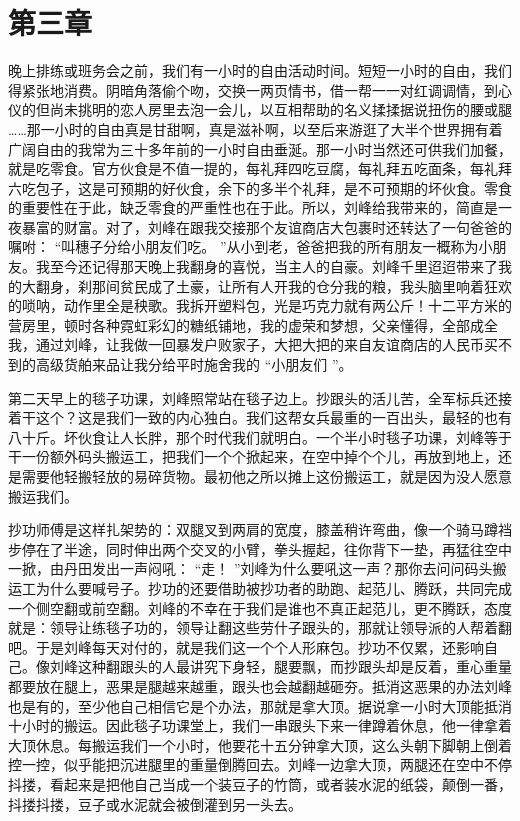 \documentclass[12pt,twoside,openany]{book}
\begin{document}
\chapter{第三章}

晚上排练或班务会之前，我们有一小时的自由活动时间。短短一小时的自由，我们得紧张地消费。阴暗角落偷个吻，交换一两页情书，借一帮一一对红调调情，到心仪的但尚未挑明的恋人房里去泡一会儿，以互相帮助的名义揉揉据说扭伤的腰或腿 ……那一小时的自由真是甘甜啊，真是滋补啊，以至后来游逛了大半个世界拥有着广阔自由的我常为三十多年前的一小时自由垂涎。那一小时当然还可供我们加餐，就是吃零食。官方伙食是不值一提的，每礼拜四吃豆腐，每礼拜五吃面条，每礼拜六吃包子，这是可预期的好伙食，余下的多半个礼拜，是不可预期的坏伙食。零食的重要性在于此，缺乏零食的严重性也在于此。所以，刘峰给我带来的，简直是一夜暴富的财富。对了，刘峰在跟我交接那个友谊商店大包裹时还转达了一句爸爸的嘱咐： “叫穗子分给小朋友们吃。 ”从小到老，爸爸把我的所有朋友一概称为小朋友。我至今还记得那天晚上我翻身的喜悦，当主人的自豪。刘峰千里迢迢带来了我的大翻身，刹那间贫民成了土豪，让所有人开我的仓分我的粮，我头脑里响着狂欢的唢呐，动作里全是秧歌。我拆开塑料包，光是巧克力就有两公斤！十二平方米的营房里，顿时各种霓虹彩幻的糖纸铺地，我的虚荣和梦想，父亲懂得，全部成全我，通过刘峰，让我做一回暴发户败家子，大把大把的来自友谊商店的人民币买不到的高级货舶来品让我分给平时施舍我的 “小朋友们 ”。

第二天早上的毯子功课，刘峰照常站在毯子边上。抄跟头的活儿苦，全军标兵还接着干这个？这是我们一致的内心独白。我们这帮女兵最重的一百出头，最轻的也有八十斤。坏伙食让人长胖，那个时代我们就明白。一个半小时毯子功课，刘峰等于干一份额外码头搬运工，把我们一个个掀起来，在空中掉个个儿，再放到地上，还是需要他轻搬轻放的易碎货物。最初他之所以摊上这份搬运工，就是因为没人愿意搬运我们。

抄功师傅是这样扎架势的：双腿叉到两肩的宽度，膝盖稍许弯曲，像一个骑马蹲裆步停在了半途，同时伸出两个交叉的小臂，拳头握起，往你背下一垫，再猛往空中一掀，由丹田发出一声闷吼： “走！ ”刘峰为什么要吼这一声？那你去问问码头搬运工为什么要喊号子。抄功的还要借助被抄功者的助跑、起范儿、腾跃，共同完成一个侧空翻或前空翻。刘峰的不幸在于我们是谁也不真正起范儿，更不腾跃，态度就是：领导让练毯子功的，领导让翻这些劳什子跟头的，那就让领导派的人帮着翻吧。于是刘峰每天对付的，就是我们这一个个人形麻包。抄功不仅累，还影响自己。像刘峰这种翻跟头的人最讲究下身轻，腿要飘，而抄跟头却是反着，重心重量都要放在腿上，恶果是腿越来越重，跟头也会越翻越砸夯。抵消这恶果的办法刘峰也是有的，至少他自己相信它是个办法，那就是拿大顶。据说拿一小时大顶能抵消十小时的搬运。因此毯子功课堂上，我们一串跟头下来一律蹲着休息，他一律拿着大顶休息。每搬运我们一个小时，他要花十五分钟拿大顶，这么头朝下脚朝上倒着控一控，似乎能把沉进腿里的重量倒腾回去。刘峰一边拿大顶，两腿还在空中不停抖搂，看起来是把他自己当成一个装豆子的竹筒，或者装水泥的纸袋，颠倒一番，抖搂抖搂，豆子或水泥就会被倒灌到另一头去。
\end{document}
